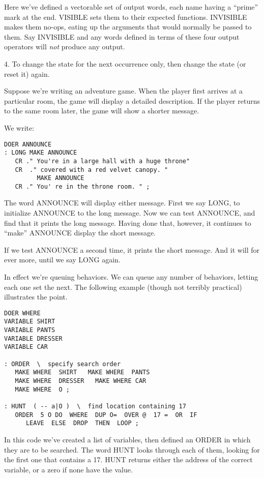 Here we've defined a vectorable set of output words, each name having a
``prime'' mark at the end. VISIBLE sets them to their expected functions.
INVISIBLE makes them no-ops, eating up the arguments that would normally
be passed to them. Say INVISIBLE and any words defined in terms
of these four output operators will \emph{not} produce any output.

4. To change the state for the next occurrence only, then change the state (or
reset it) again.

Suppose we're writing an adventure game. When the player first arrives at
a particular room, the game will display a detailed description. If the player
returns to the same room later, the game will show a shorter message.

We write:

\begin{verbatim}
DOER ANNOUNCE
: LONG MAKE ANNOUNCE
   CR ." You're in a large hall with a huge throne"
   CR  ." covered with a red velvet canopy. "
         MAKE ANNOUNCE
   CR ." You' re in the throne room. " ;
\end{verbatim}

The word ANNOUNCE will display either message. First we say LONG, to
initialize ANNOUNCE to the long message. Now we can test ANNOUNCE,
and find that it prints the long message. Having done that,
however, it continues to ``make'' ANNOUNCE display the short message.

If we test ANNOUNCE a second time, it prints the short message. And it
will for ever more, until we say LONG again.

In effect we're queuing behaviors. We can queue any number of behaviors,
letting each one set the next. The following example (though not terribly
practical) illustrates the point.

\begin{verbatim}
DOER WHERE
VARIABLE SHIRT
VARIABLE PANTS
VARIABLE DRESSER
VARIABLE CAR

: ORDER  \  specify search order
   MAKE WHERE  SHIRT   MAKE WHERE  PANTS
   MAKE WHERE  DRESSER   MAKE WHERE CAR
   MAKE WHERE  O ;

: HUNT  ( -- a|O )  \  find location containing 17
   ORDER  5 O DO  WHERE  DUP O=  OVER @  17 =  OR  IF
      LEAVE  ELSE  DROP  THEN  LOOP ;
\end{verbatim}

In this code we've created a list of variables, then defined an ORDER in
which they are to be searched. The word HUNT looks through each of them,
looking for the first one that contains a 17. HUNT returns either the
address of the correct variable, or a zero if none have the value.

